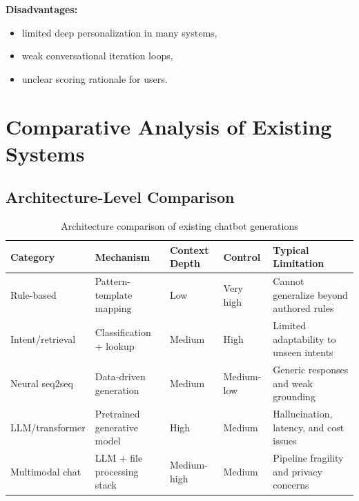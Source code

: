 \documentclass[conference]{IEEEtran}
\begin{document}
\textbf{Disadvantages:}
\begin{itemize}
    \item limited deep personalization in many systems,
    \item weak conversational iteration loops,
    \item unclear scoring rationale for users.
\end{itemize}

\section{Comparative Analysis of Existing Systems}
\subsection{Architecture-Level Comparison}
\begin{table}[ht]
\centering
\caption{Architecture comparison of existing chatbot generations}
\begin{tabular}{|p{2.6cm}|p{2.6cm}|p{2.3cm}|p{2.2cm}|p{4.1cm}|}
\hline
\textbf{Category} & \textbf{Mechanism} & \textbf{Context Depth} & \textbf{Control} & \textbf{Typical Limitation} \\
\hline
Rule-based & Pattern-template mapping & Low & Very high & Cannot generalize beyond authored rules \\
\hline
Intent/retrieval & Classification + lookup & Medium & High & Limited adaptability to unseen intents \\
\hline
Neural seq2seq & Data-driven generation & Medium & Medium-low & Generic responses and weak grounding \\
\hline
LLM/transformer & Pretrained generative model & High & Medium & Hallucination, latency, and cost issues \\
\hline
Multimodal chat & LLM + file processing stack & Medium-high & Medium & Pipeline fragility and privacy concerns \\
\hline
\end{tabular}
\end{table}
\end{document}
